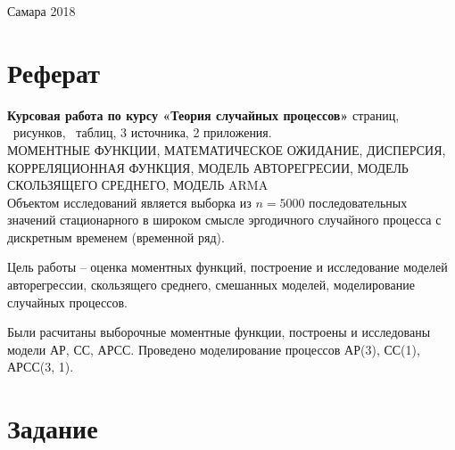 \documentclass[12pt, fleqn]{article}
\begin{document}
\begin{titlepage}
						
							
	\vfill\vfill\vfill
					
	{\centering Самара 2018}
							
							
\end{titlepage}
\setcounter{page}{2}
\newpage
\section*{Реферат}
{
	\textbf{Курсовая работа по курсу «Теория случайных процессов»} 
	\pageref{LastPage} страниц,
	\totalfigures\ рисунков,
	\totaltables\ таблиц,
	3 источника,
	2 приложения.\\
				
	МОМЕНТНЫЕ ФУНКЦИИ, МАТЕМАТИЧЕСКОЕ ОЖИДАНИЕ, ДИСПЕРСИЯ, КОРРЕЛЯЦИОННАЯ ФУНКЦИЯ, МОДЕЛЬ АВТОРЕГРЕСИИ, МОДЕЛЬ СКОЛЬЗЯЩЕГО СРЕДНЕГО, МОДЕЛЬ ARMA\\
						  
	Объектом исследований является выборка из $n = 5000$ последовательных значений стационарного в широком смысле эргодичного случайного процесса с дискретным временем (временной ряд).
						  
	Цель работы -- оценка моментных функций, построение и исследование моделей авторегрессии, скользящего среднего, смешанных моделей, моделирование случайных процессов.
						  
	Были расчитаны выборочные моментные функции, построены и исследованы модели АР, СС, АРСС. Проведено моделирование процессов АР(3), СС(1), АРСС(3, 1).
}



\newpage
\tableofcontents
\newpage


\newpage
\section{Задание}
\end{document}
